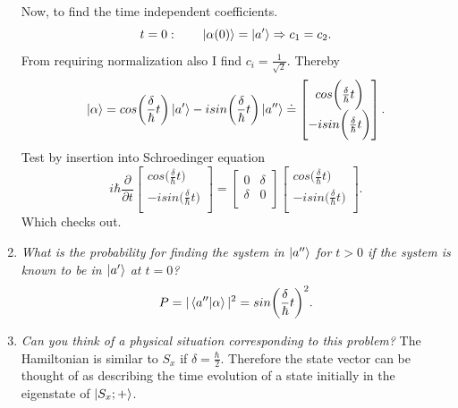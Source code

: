 \begin{example}
\begin{enumerate}
\begin{equation}
\begin{split}
			\end{split}
		\end{equation} 
		Now, to find the time independent coefficients.
		\begin{equation}
			t=0:\qquad \ket{\alpha(0)}=\ket{a'} \Rightarrow c_1=c_2.
		\end{equation} 
		From requiring normalization also I find $c_i=\frac{1}{\sqrt{2}}$. Thereby
		\begin{equation}
			\ket{\alpha}=cos\bigg(\frac{\delta}{\hbar}t\bigg)\ket{a'}-isin\bigg(\frac{\delta}{\hbar}t\bigg)\ket{a''}\doteq \begin{bmatrix}
				cos\bigg(\frac{\delta}{\hbar}t\bigg)\\
				-isin\bigg(\frac{\delta}{\hbar}t\bigg)\\
			\end{bmatrix}.
		\end{equation} 
		Test by insertion into Schroedinger equation
		\begin{equation}
			i\hbar \frac{\partial}{\partial t}\begin{bmatrix}
				cos\bigg(\frac{\delta}{\hbar}t\bigg)\\
				-isin\bigg(\frac{\delta}{\hbar}t\bigg)\\
			\end{bmatrix}=\begin{bmatrix}
				0 & \delta  \\
				\delta & 0\\
			\end{bmatrix}\begin{bmatrix}
				cos\bigg(\frac{\delta}{\hbar}t\bigg)\\
				-isin\bigg(\frac{\delta}{\hbar}t\bigg)\\
			\end{bmatrix}.
		\end{equation} 
		Which checks out.
		\item \emph{What is the probability for finding the system in $\ket{a''}$ for $t>0$ if the system is known to be in $\ket{a'}$ at $t=0$?}\newline
		\begin{equation}
			P=|\braket{a''|\alpha}|^2=sin\bigg(\frac{\delta}{\hbar}t\bigg)^2.
		\end{equation} 
		\item \emph{Can you think of a physical situation corresponding to this problem?}\newline
		The Hamiltonian is similar to $S_x$ if $\delta=\frac{\hbar}{2}$. Therefore the state vector can be thought of as describing the time evolution of a state initially in the eigenstate of $\ket{S_x;+}$.
	\end{enumerate}
\end{example}


